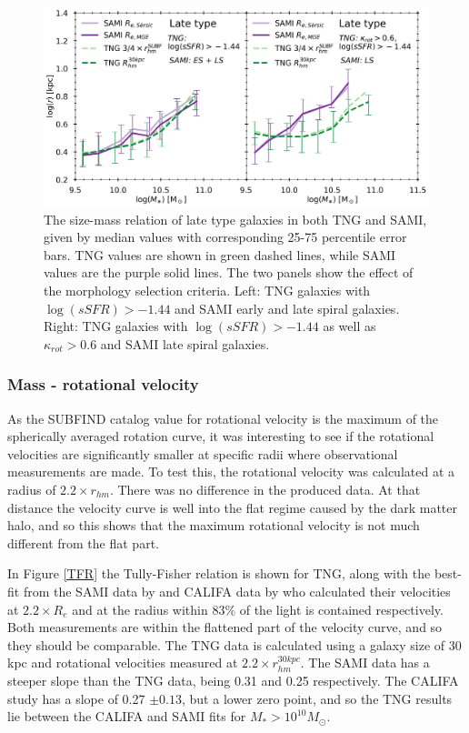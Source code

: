 \begin{figure}
    \centering
    \includegraphics[width=\textwidth]{images/SM_R_lates.png}
    \caption{The size-mass relation of late type galaxies in both TNG and SAMI, given by median values with corresponding 25-75 percentile error bars. TNG values are shown in green dashed lines, while SAMI values are the purple solid lines. The two panels show the effect of the morphology selection criteria. Left: TNG galaxies with $\log(sSFR) > -1.44$ and SAMI early and late spiral galaxies. Right: TNG galaxies with $\log(sSFR) > -1.44$ as well as $\kappa_{rot} > 0.6$ and SAMI late spiral galaxies.}
    \label{SM_R_lates}
\end{figure}

\subsubsection{Mass - rotational velocity}
As the SUBFIND catalog value for rotational velocity is the maximum of the spherically averaged rotation curve, it was interesting to see if the rotational velocities are significantly smaller at specific radii where observational measurements are made. To test this, the rotational velocity was calculated at a radius of $2.2 \times r_{hm}$. There was no difference in the produced data. At that distance the velocity curve is well into the flat regime caused by the dark matter halo, and so this shows that the maximum rotational velocity is not much different from the flat part.

In Figure \ref{TFR} the Tully-Fisher relation is shown for TNG, along with the best-fit from the SAMI data by \textcite{Bloom2017} and CALIFA data by \textcite{Bekerait2016} who calculated their velocities at $2.2 \times R_e$ and at the radius within 83\% of the light is contained respectively. Both measurements are within the flattened part of the velocity curve, and so they should be comparable. The TNG data is calculated using a galaxy size of 30 kpc and rotational velocities measured at $2.2 \times r_{hm}^{30kpc}$. The SAMI data has a steeper slope than the TNG data, being 0.31 and 0.25 respectively. The CALIFA study has a slope of 0.27 $\pm 0.13$, but a lower zero point, and so the TNG results lie between the CALIFA and SAMI fits for $M_\ast > 10^{10}M_{\odot}$. 


